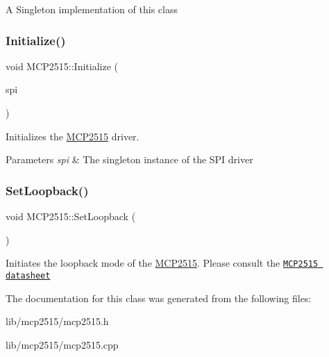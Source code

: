 A Singleton implementation of this class \hypertarget{class_m_c_p2515_a41921933b4f2595e8935f8432dd8d65b}{}\label{class_m_c_p2515_a41921933b4f2595e8935f8432dd8d65b} 
\subsubsection{\texorpdfstring{Initialize()}{Initialize()}}
{\footnotesize\ttfamily void M\+C\+P2515\+::\+Initialize (\begin{DoxyParamCaption}\item[{\hyperlink{class_s_p_i___n_1_1_s_p_i}{S\+P\+I\+\_\+\+N\+::\+S\+PI} $\ast$}]{spi }\end{DoxyParamCaption})}

Initializes the \hyperlink{class_m_c_p2515}{M\+C\+P2515} driver. 
\begin{DoxyParams}{Parameters}
{\em spi} & The singleton instance of the S\+PI driver \\
\hline
\end{DoxyParams}
\hypertarget{class_m_c_p2515_a7aac5fdb713b83933391348f1188f2b9}{}\label{class_m_c_p2515_a7aac5fdb713b83933391348f1188f2b9} 
\subsubsection{\texorpdfstring{Set\+Loopback()}{SetLoopback()}}
{\footnotesize\ttfamily void M\+C\+P2515\+::\+Set\+Loopback (\begin{DoxyParamCaption}{ }\end{DoxyParamCaption})}

Initiates the loopback mode of the \hyperlink{class_m_c_p2515}{M\+C\+P2515}. Please consult the \href{http://ww1.microchip.com/downloads/en/DeviceDoc/21801G.pdf}{\tt M\+C\+P2515 datasheet} 

The documentation for this class was generated from the following files\+:\begin{DoxyCompactItemize}
\item 
lib/mcp2515/mcp2515.\+h\item 
lib/mcp2515/mcp2515.\+cpp\end{DoxyCompactItemize}
